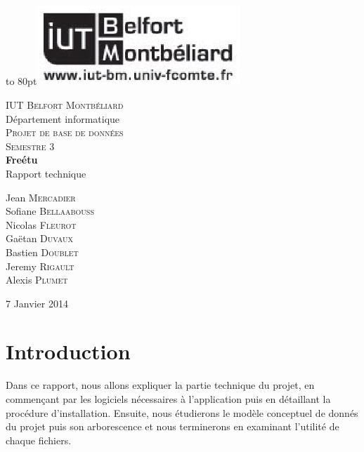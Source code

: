\documentclass[a4paper,10pt]{report}
\begin{document}
\begin{titlepage}

\vbox to 80pt{\hfill\includegraphics[height=3cm]{logo-iut.eps}}\
\begin{center}

\textsc{\LARGE IUT Belfort Montb\'eliard}\\\Large D\'epartement informatique\\[1.5cm]

\textsc{\Large Projet de base de donn\'ees}\\[0.5cm]
\textsc{\Large Semestre 3}\\[5cm]


{ \huge \bfseries Fre\'etu}\\\Large Rapport technique\\[5cm]

\begin{large}
Jean \textsc{Mercadier}\\[0.3em]
Sofiane \textsc{Bellaabouss}\\[0.3em]
Nicolas \textsc{Fleurot}\\[0.3em]
Gaëtan \textsc{Duvaux}\\[0.3em]
Bastien \textsc{Doublet}\\[0.3em]
Jeremy \textsc{Rigault}\\[0.3em]
Alexis \textsc{Plumet}\\[0.3em]
\end{large}

\vfill

{\large 7 Janvier 2014}

\end{center}
\end{titlepage}

\tableofcontents

\chapter*{Introduction}

Dans ce rapport, nous allons expliquer la partie technique du projet, en commen\c{c}ant
par les logiciels n\'ecessaires \`a l'application puis en d\'etaillant la proc\'edure
d'installation. Ensuite, nous \'etudierons le mod\`ele conceptuel de donn\'es du projet
puis son arborescence et nous terminerons en examinant l'utilit\'e de chaque fichiers.
\end{document}
